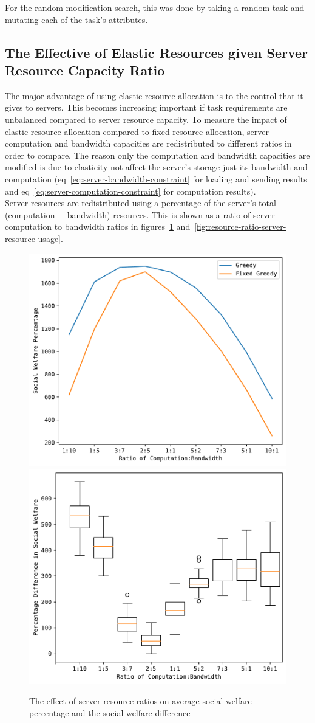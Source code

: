 For the random modification search, this was done by taking a random task and mutating each of the task's attributes.

\subsection{The Effective of Elastic Resources given Server Resource Capacity Ratio}
\label{subsec:the-effective-of-elastic-resources-given-server-resource-capacity-ratio}
The major advantage of using elastic resource allocation is to the control that it gives to servers. This becomes
increasing important if task requirements are unbalanced compared to server resource capacity. To measure the impact
of elastic resource allocation compared to fixed resource allocation, server computation and bandwidth capacities
are redistributed to different ratios in order to compare. The reason only the computation and bandwidth capacities
are modified is due to elasticity not affect the server's storage just its bandwidth and computation
(eq~\ref{eq:server-bandwidth-constraint} for loading and sending results and eq~\ref{eq:server-computation-constraint}
for computation results). \\
Server resources are redistributed using a percentage of the server's total (computation + bandwidth) resources.
This is shown as a ratio of server computation to bandwidth ratios in figures~\ref{fig:resource-ratio-social-welfare}
and~\ref{fig:resource-ratio-server-resource-usage}.

\begin{figure}[h]
    \centering
    \includegraphics[width=0.45\linewidth]{figs/resource_ratio/social_welfare.pdf}
    \includegraphics[width=0.45\linewidth]{figs/resource_ratio/social_welfare_difference.pdf}
    \caption{The effect of server resource ratios on average social welfare percentage and the social welfare difference}
    \label{fig:resource-ratio-social-welfare}
\end{figure}

